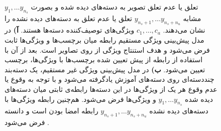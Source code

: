 \begin{figure}[!ht]
{  $y_1, \ldots y_{n_s}$
  تعلق یا عدم تعلق تصویر به دسته‌های دیده شده و بصورت مشابه 
  $y_{n_s +1}, \ldots y_{n_s+n_u}$
  تعلق یا عدم تعلق به دسته‌های دیده نشده را نشان می‌دهند. 
  $c_1, \ldots, c_a$
  ویژگی‌های توصیف‌کننده دسته‌ها هستند.
\textbf{آ)}
در مدل پیش‌بینی ویژگی مستقیم رابطه میان برچسب‌ها و ویژگی‌ها ثابت فرض می‌شود و هدف استنتاج ویژگی از روی تصاویر است. بعد از آن با استفاده از رابطه از پیش تعیین شده برچسب‌ها با ویژگی‌ها، برچسب تعیین می‌شود. 
\textbf{ب)}
در مدل پیش‌بینی ویژگی غیر مستقیم، یک دسته‌بند چنددسته‌ای روی دسته‌های آموزش یادگرفته می‌شود و با توجه به وقوع یا عدم وقوع هر یک از ویژگی‌ها در این دسته‌ها رابطه‌ی ثابتی میان دسته‌های دیده شده 
$y_1, \ldots y_{n_s}$
و ویژگی‌ها فرض می‌شود. هم‌چنین رابطه ویژگی‌ها با دسته‌های دیده نشده 
$y_{n_s +1}, \ldots y_{n_s+n_u}$
رابطه امضا بودن است و دانسته فرض می‌شود \cite{lampert09}.
  }
  \label{fig:diap}
\end{figure}
